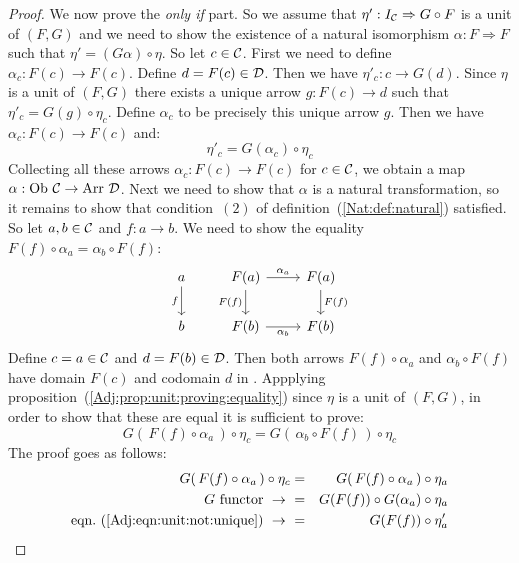 \begin{proof}
    We now prove the {\em only if} part. So we assume that 
    $\eta':I_{\cal C}\Rightarrow G\circ F$ is a unit of $(F,G)$ and we need
    to show the existence of a natural isomorphism $\alpha:F\Rightarrow F$
    such that $\eta'=(G\alpha)\circ\eta$. So let $c\in\mbox{$\cal C$}$. First we need
    to define $\alpha_{c}:F(c)\to F(c)$. Define $d=F(c)\in\mbox{$\cal D$}$. Then we 
    have $\eta'_{c}:c\to G(d)$. Since $\eta$ is a unit of $(F,G)$ there exists
    a unique arrow $g:F(c)\to d$ such that $\eta'_{c}=G(g)\circ\eta_{c}$.
    Define $\alpha_{c}$ to be precisely this unique arrow $g$. Then we 
    have $\alpha_{c}:F(c)\to F(c)$ and:
        \begin{equation}\label{Adj:eqn:counit:not:unique}
            \eta'_{c}=G(\alpha_{c})\circ\eta_{c}
        \end{equation}
    Collecting all these arrows $\alpha_{c}:F(c)\to F(c)$ for $c\in\mbox{$\cal C$}$,
    we obtain a map $\alpha:\mbox{\rm Ob}\ \mbox{$\cal C$}\to\mbox{\rm Arr}\ \mbox{$\cal D$}$. Next we need to show 
    that $\alpha$ is a natural transformation, so it remains to show that
    condition~$(2)$ of definition~(\ref{Nat:def:natural}) satisfied. So
    let $a,b\in\mbox{$\cal C$}$ and $f:a\to b$. We need to show the equality
    $F(f)\circ\alpha_{a}=\alpha_{b}\circ F(f)$:
    \[
        \begin{tikzcd}
            a\arrow[d,swap, "f"]
            &F(a)\arrow[r, "\alpha_{a}"]\arrow[d, swap,"F(f)"]
            &F(a)\arrow[d, "F(f)"]
            \\
            b
            &F(b)\arrow[r, swap, "\alpha_{b}"]
            &F(b)
        \end{tikzcd}
    \]
    Define $c=a\in\mbox{$\cal C$}$ and $d=F(b)\in\mbox{$\cal D$}$. Then both arrows 
    $F(f)\circ\alpha_{a}$ and $\alpha_{b}\circ F(f)$ have domain $F(c)$ and
    codomain $d$ in \Dat. Appplying 
    proposition~(\ref{Adj:prop:unit:proving:equality}) 
    since $\eta$ is a unit of $(F,G)$, in order to show that these are equal
    it is sufficient to prove:
        \[
            G(\,F(f)\circ\alpha_{a}\,)\circ\eta_{c}=
            G(\,\alpha_{b}\circ F(f)\,)\circ\eta_{c}
        \]
    The proof goes as follows:
        \begin{eqnarray*}G(\,F(f)\circ\alpha_{a}\,)\circ\eta_{c}
            &=&G(\,F(f)\circ\alpha_{a}\,)\circ\eta_{a}\\
            \mbox{$G$ functor}\ \to\ 
            &=&G(F(f))\circ G(\alpha_{a})\circ\eta_{a}\\
            \mbox{eqn.~(\ref{Adj:eqn:unit:not:unique})}\ \to\ 
            &=&G(F(f))\circ\eta'_{a}\\

\end{eqnarray*}
\end{proof}
